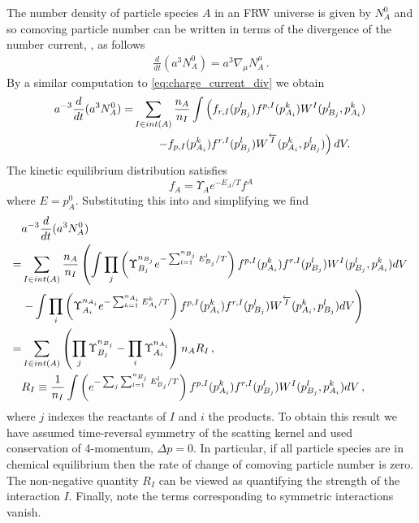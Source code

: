 {The number density of particle species $A$ in an FRW universe is given by $N_A^0$ and so comoving particle number can be written in terms of the divergence of the number current, , as follows
\begin{align}
\frac{d}{dt}(a^3N^0_A)=a^{3} \nabla_\mu N_A^\mu\,.  
\end{align}
By a similar computation to \eqref{eq:charge_current_div} we obtain
\begin{align}\label{eq:FRWcomovingNumGen}
a^{-3}\frac{d}{dt}(a^3N^0_A)=&\sum_{I\in int(A)} \frac{n_A}{n_I}\int\left(f_{r,I}(p_{B_j}^l)f^{p,I}(p_{A_i}^k)W^I(p_{B_j}^l,p_{A_i}^k) \right.\\
&\left. \qquad-f_{p,I}(p_{A_i}^k)f^{r,I}(p_{B_j}^l)W^{\overleftarrow{I}}(p_{A_i}^k,p_{B_j}^l)\right)  dV.\notag
\end{align}
The kinetic equilibrium distribution satisfies
\begin{equation}
f_A=\Upsilon_A e^{-E_A/T}f^A
\end{equation}
where $E=p_A^0$. Substituting this into  and simplifying we find
\begin{align}\label{eq:comovingPartNumFRWfinal}
&a^{-3}\frac{d}{dt}(a^3N_A^0)\\
=&\sum_{I\in int(A)}\frac{n_A}{n_I}\left(\int \prod_j\left(\Upsilon_{B_j}^{n_{B_j}}e^{-\sum_{l=1}^{n_{B_j}}E_{B_j}^l/T}\right)f^{p,I}(p_{A_i}^k)f^{r,I}(p_{B_j}^l)W^I(p_{B_j}^l,p_{A_i}^k)dV\right.\notag\\
&\left. -\int \prod_i\left(\Upsilon_{A_i}^{n_{A_i}}e^{-\sum_{k=1}^{n_{A_i}}E_{A_i}^k/T}\right)f^{p,I}(p_{A_i}^k)f^{r,I}(p_{B_j}^l)W^{\overleftarrow{I}}(p_{A_i}^k,p_{B_j}^l)dV\right)\notag\\
=&\sum_{I\in int(A)}\left(\prod_j\Upsilon_{B_j}^{n_{B_j}}- \prod_i\Upsilon_{A_i}^{n_{A_i}}\right){n_A}R_I\,,\notag\\
&R_I\equiv \frac{1}{n_I}\int\left(e^{-\sum_j\sum_{l=1}^{n_{B_j}}E_{B_j}^l/T}\right) f^{p,I}(p_{A_i}^k)f^{r,I}(p_{B_j}^l)W^I(p_{B_j}^l,p_{A_i}^k)dV\notag\,,
\end{align}
where $j$ indexes the reactants of $I$ and $i$ the products. To obtain this result we have assumed time-reversal symmetry of the scatting kernel  and used conservation of 4-momentum, $\Delta p=0$.    In particular, if all particle species are in chemical equilibrium then the rate of change of comoving particle number is zero. The non-negative quantity $R_I$ can be viewed as quantifying the strength of the interaction $I$. Finally, note the terms corresponding to symmetric interactions vanish. 

}
